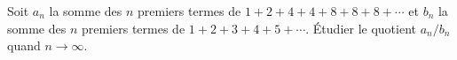 Soit $a_n$ la somme des $n$ premiers termes de $1 + 2 + 4 + 4 + 8 + 8 + 8 + \cdots$ et $b_n$ la somme des $n$ premiers termes de $1 + 2 + 3 + 4 + 5 + \cdots$. Étudier le quotient $a_n/b_n$ quand $n \to \infty$.
